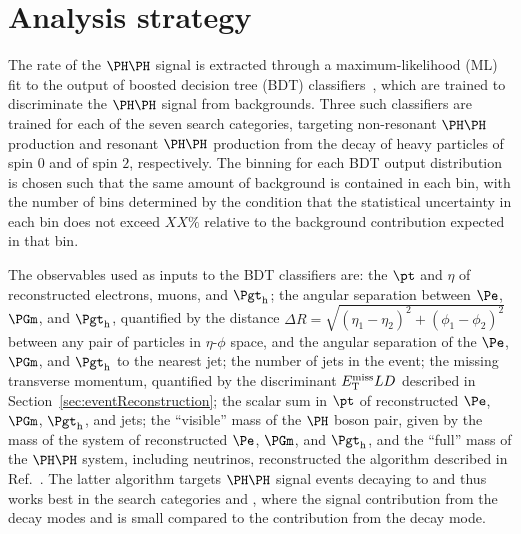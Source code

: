 \section{Analysis strategy}
\label{sec:analysisStrategy}

The rate of the $\HH$ signal is extracted through a maximum-likelihood (ML) fit to
the output of boosted decision tree (BDT) classifiers~\cite{Breiman:1984jka},
which are trained to discriminate the $\HH$ signal from backgrounds.
Three such classifiers are trained for each of the seven search categories,
targeting non-resonant $\HH$ production and resonant $\HH$ production from
the decay of heavy particles of spin $0$ and of spin $2$, respectively.
The binning for each BDT output distribution is chosen such that the same
amount of background is contained in each bin, with the number of bins
determined by the condition that the statistical uncertainty in each bin does
not exceed $XX\%$ relative to the background contribution expected in that bin.

The observables used as inputs to the BDT classifiers are:
the $\pt$ and $\eta$ of reconstructed electrons, muons, and $\tauh$;
the angular separation between $\Pe$, $\PGm$, and $\tauh$,
quantified by the distance $\Delta R = \sqrt{(\eta_{1} - \eta_{2})^{2} + (\phi_{1} - \phi_{2})^{2}}$ between any pair of particles in $\eta$-$\phi$ space,
and the angular separation of the $\Pe$, $\PGm$, and $\tauh$ to the nearest jet;
the number of jets in the event;
the missing transverse momentum, quantified by the discriminant $E_{\mathrm{T}}^\text{miss} LD$ described in Section~\ref{sec:eventReconstruction};
the scalar sum in $\pt$ of reconstructed $\Pe$, $\PGm$, $\tauh$, and jets;
the ``visible'' mass of the $\PHiggs$ boson pair, given by the mass of the system of reconstructed $\Pe$, $\PGm$, and $\tauh$,
and the ``full'' mass of the $\HH$ system, including neutrinos, reconstructed the algorithm described in Ref.~\cite{Ehataht:2018nql}.
The latter algorithm targets $\HH$ signal events decaying to \tttt and thus works best in the search categories \zeroLeptonFourTau and \oneLeptonThreeTau,
where the signal contribution from the decay modes \WWWW and \WWtt is small compared to the contribution from the \tttt decay mode.

